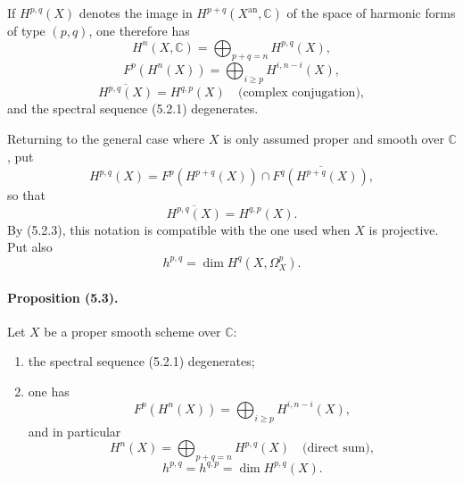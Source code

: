 \documentclass[10pt]{article}
\providecommand{\C}{\mathbb C}
\providecommand{\an}{\mathrm{an}}
\begin{document}
If $H^{p,q}(X)$ denotes the image in $H^{p+q}(X^{\an},\C)$ of the space of harmonic forms of type $(p,q)$, one therefore has
\[
\tag{5.2.2}
H^n(X,\C)=\bigoplus_{p+q=n}H^{p,q}(X),
\]
\[
\tag{5.2.3}
F^p(H^n(X))=\bigoplus_{i\ge p}H^{i,n-i}(X),
\]
\[
\tag{5.2.4}
\overline{H^{p,q}(X)}=H^{q,p}(X)
\quad\text{(complex conjugation)},
\]
and the spectral sequence (5.2.1) degenerates.

Returning to the general case where $X$ is only assumed proper and smooth over $\C$, put
\[
\tag{5.2.5}
H^{p,q}(X)=F^p(H^{p+q}(X))\cap\overline{F^q(H^{p+q}(X))},
\]
so that
\[
\tag{5.2.6}
\overline{H^{p,q}(X)}=H^{q,p}(X).
\]
By (5.2.3), this notation is compatible with the one used when $X$ is projective. Put also
\[
\tag{5.2.7}
h^{p,q}=\dim H^q(X,\Omega_X^p).
\]

\paragraph{Proposition (5.3).} Let $X$ be a proper smooth scheme over $\C$:
\begin{enumerate}[label=(\roman*)]
\item the spectral sequence (5.2.1) degenerates;
\item one has
\[
\tag{5.3.1}
F^p(H^n(X))=\bigoplus_{i\ge p}H^{i,n-i}(X),
\]
and in particular
\[
\tag{5.3.2}
H^n(X)=\bigoplus_{p+q=n}H^{p,q}(X)
\quad\text{(direct sum)},
\]
\[
\tag{5.3.3}
h^{p,q}=h^{q,p}=\dim H^{p,q}(X).
\]
\end{enumerate}
\end{document}
